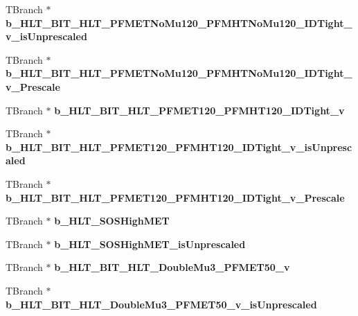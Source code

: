 \begin{DoxyCompactItemize}
T\+Branch $\ast$ {\bfseries b\+\_\+\+H\+L\+T\+\_\+\+B\+I\+T\+\_\+\+H\+L\+T\+\_\+\+P\+F\+M\+E\+T\+No\+Mu120\+\_\+\+P\+F\+M\+H\+T\+No\+Mu120\+\_\+\+I\+D\+Tight\+\_\+v\+\_\+is\+Unprescaled}
\item 
\hypertarget{classMiniTree_af20a58de4e39ca3aba58f56bca6480bd}{}\label{classMiniTree_af20a58de4e39ca3aba58f56bca6480bd} 
T\+Branch $\ast$ {\bfseries b\+\_\+\+H\+L\+T\+\_\+\+B\+I\+T\+\_\+\+H\+L\+T\+\_\+\+P\+F\+M\+E\+T\+No\+Mu120\+\_\+\+P\+F\+M\+H\+T\+No\+Mu120\+\_\+\+I\+D\+Tight\+\_\+v\+\_\+\+Prescale}
\item 
\hypertarget{classMiniTree_a710ced6f2544a530062d5baf20f7d9a1}{}\label{classMiniTree_a710ced6f2544a530062d5baf20f7d9a1} 
T\+Branch $\ast$ {\bfseries b\+\_\+\+H\+L\+T\+\_\+\+B\+I\+T\+\_\+\+H\+L\+T\+\_\+\+P\+F\+M\+E\+T120\+\_\+\+P\+F\+M\+H\+T120\+\_\+\+I\+D\+Tight\+\_\+v}
\item 
\hypertarget{classMiniTree_a5c8877cd6291504bc383b7e1892d4d1b}{}\label{classMiniTree_a5c8877cd6291504bc383b7e1892d4d1b} 
T\+Branch $\ast$ {\bfseries b\+\_\+\+H\+L\+T\+\_\+\+B\+I\+T\+\_\+\+H\+L\+T\+\_\+\+P\+F\+M\+E\+T120\+\_\+\+P\+F\+M\+H\+T120\+\_\+\+I\+D\+Tight\+\_\+v\+\_\+is\+Unprescaled}
\item 
\hypertarget{classMiniTree_aac06ed6a894cdaaef4a2892c0f6ff8d5}{}\label{classMiniTree_aac06ed6a894cdaaef4a2892c0f6ff8d5} 
T\+Branch $\ast$ {\bfseries b\+\_\+\+H\+L\+T\+\_\+\+B\+I\+T\+\_\+\+H\+L\+T\+\_\+\+P\+F\+M\+E\+T120\+\_\+\+P\+F\+M\+H\+T120\+\_\+\+I\+D\+Tight\+\_\+v\+\_\+\+Prescale}
\item 
\hypertarget{classMiniTree_abf67b2e04b76953c1884aa9f403fa4cc}{}\label{classMiniTree_abf67b2e04b76953c1884aa9f403fa4cc} 
T\+Branch $\ast$ {\bfseries b\+\_\+\+H\+L\+T\+\_\+\+S\+O\+S\+High\+M\+ET}
\item 
\hypertarget{classMiniTree_a7e3d925fc9eedb10637d21434f64ced7}{}\label{classMiniTree_a7e3d925fc9eedb10637d21434f64ced7} 
T\+Branch $\ast$ {\bfseries b\+\_\+\+H\+L\+T\+\_\+\+S\+O\+S\+High\+M\+E\+T\+\_\+is\+Unprescaled}
\item 
\hypertarget{classMiniTree_a88c1a1e43b6e64b8778bafcd726a8583}{}\label{classMiniTree_a88c1a1e43b6e64b8778bafcd726a8583} 
T\+Branch $\ast$ {\bfseries b\+\_\+\+H\+L\+T\+\_\+\+B\+I\+T\+\_\+\+H\+L\+T\+\_\+\+Double\+Mu3\+\_\+\+P\+F\+M\+E\+T50\+\_\+v}
\item 
\hypertarget{classMiniTree_a1c30b29d2a74a29a5ab77c31a78935d5}{}\label{classMiniTree_a1c30b29d2a74a29a5ab77c31a78935d5} 
T\+Branch $\ast$ {\bfseries b\+\_\+\+H\+L\+T\+\_\+\+B\+I\+T\+\_\+\+H\+L\+T\+\_\+\+Double\+Mu3\+\_\+\+P\+F\+M\+E\+T50\+\_\+v\+\_\+is\+Unprescaled}

\end{DoxyCompactItemize}
